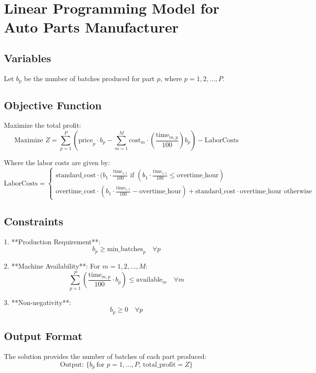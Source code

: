 \documentclass{article}
\begin{document}
\section*{Linear Programming Model for Auto Parts Manufacturer}

\subsection*{Variables}
Let \( b_p \) be the number of batches produced for part \( p \), where \( p = 1, 2, \ldots, P \).

\subsection*{Objective Function}
Maximize the total profit:
\[
\text{Maximize } Z = \sum_{p=1}^{P} \left( \text{price}_p \cdot b_p - \sum_{m=1}^{M} \text{cost}_m \cdot \left(\frac{\text{time}_{m,p}}{100}\right) b_p \right) - \text{LaborCosts}
\]

Where the labor costs are given by:
\[
\text{LaborCosts} = 
\begin{cases} 
\text{standard\_cost} \cdot (b_1 \cdot \frac{\text{time}_{1,1}}{100} \text{ if } (b_1 \cdot \frac{\text{time}_{1,1}}{100} \leq \text{overtime\_hour}) \\ 
\text{overtime\_cost} \cdot (b_1 \cdot \frac{\text{time}_{1,1}}{100} - \text{overtime\_hour}) + \text{standard\_cost} \cdot \text{overtime\_hour} \text{ otherwise}
\end{cases}
\]

\subsection*{Constraints}

1. **Production Requirement**:
   \[
   b_p \geq \text{min\_batches}_p \quad \forall p
   \]

2. **Machine Availability**:
   For \( m = 1, 2, \ldots, M \):
   \[
   \sum_{p=1}^{P} \left(\frac{\text{time}_{m,p}}{100} \cdot b_p\right) \leq \text{available}_m \quad \forall m
   \]

3. **Non-negativity**:
   \[
   b_p \geq 0 \quad \forall p
   \]

\subsection*{Output Format}
The solution provides the number of batches of each part produced:
\[
\text{Output: } \{ b_p \, \text{for } p = 1, \ldots, P, \, \text{total\_profit} = Z \}
\]
\end{document}
